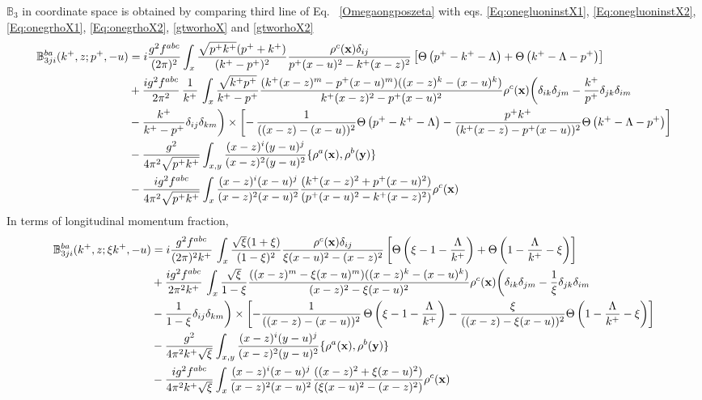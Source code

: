 \documentclass[aps,prd,amsmath,amssymb,nofootinbib]{revtex4-2}
\def\mf#1{\mathbb{#1}}
\def\v#1{\mathbf{#1}}
\numberwithin{equation}{section}
\begin{document}
$\mf{B}_{3}$ in coordinate space is obtained by comparing third line of Eq.~ \eqref{Omegaongposzeta} with eqs. \eqref{Eq:onegluoninstX1}, \eqref{Eq:onegluoninstX2}, \eqref{Eq:onegrhoX1}, \eqref{Eq:onegrhoX2}, \eqref{gtworhoX} and \eqref{gtworhoX2}
\begin{align}
   \mf{B}^{ba}_{3ji}(k^+, z;p^+, -u) & = i \frac{g^2 f^{abc}}{(2\pi)^{2}} \int_{x} %
   \frac{\sqrt{p^{+}k^{+}}(p^{+}+k^{+})} {(k^{+}-p^{+})^2} \frac{\rho^c(\v{x}) \delta_{ij}}{p^{+}(x-u)^{2} - k^{+}(x-z)^{2} }\left[\Theta\left(p^{+} - k^{+} - \Lambda \right)+\Theta\left(k^{+}-\Lambda-p^{+}\right)\right]  \notag \\ & + \frac{ig^2 f^{abc}} {2\pi^{2} } \,\frac{1}{k^{+}}\, 
   \int_{x}  
   \frac{\sqrt{k^{+}p^{+}}}{k^{+}-p^{+}} 
   \frac{(k^{+}(x-z)^{m} - p^{+} (x-u)^m)((x-z)^{k} -  (x-u)^{k})} {k^{+}(x-z)^{2} - p^{+} (x-u)^2}
   \rho^c(\v{x}) \bigg( 
  \delta_{ik} \delta_{jm}
  - \frac{k^{+}}{p^{+}}\delta_{jk} \delta_{im}
 \notag \\ &  - \frac{k^{+}}{k^{+}-p^{+}}\delta_{ij} \delta_{km}
   \bigg)\times\left[-\,\frac{1}{((x-z) -  (x-u))^2}\Theta\left(p^{+} - k^{+} - \Lambda \right)-\frac{p^{+}k^{+}}{(k^{+}(x-z) -  p^{+} (x-u))^2} \Theta\left(k^{+}-\Lambda-p^{+}\right)\right]\notag \\ & -\frac{g^{2}}{4\pi^{2} \sqrt{p^{+}k^{+}}}\int_{x,y}\frac{(x-z)^{i} (y-u)^{j}}{(x-z)^{ 2}(y-u)^{2}}\{\rho^{a}(\v{x}),\rho^{b}(\v{y})\} \notag \\ &  -\frac{ig^{2}f^{abc}}{4\pi^{2} \sqrt{p^{+}k^{+}}} \int_{x}\frac{(x-z)^{i}(x-u)^{j}}{(x-z)^{2}(x-u)^{2}}\frac{(k^{+}(x-z)^{2} +p^{+} (x-u)^{2})}{(p^{+} (x-u)^{2}-k^{+}(x-z)^{2})}\rho^{c}(\v{x})
\end{align}
In terms of longitudinal momentum fraction,
\begin{align}
   \mf{B}^{ba}_{3ji}(k^+, z;\xi k^+, -u) & = i \frac{g^2 f^{abc}}{(2\pi)^{2} k^{+}}\,\int_{x}
   \frac{\sqrt{\xi} (1+\xi) } {(1-\xi)^2} \frac{\rho^c(\v{x}) \delta_{ij}}{\xi (x-u)^{2} - (x-z)^{2} }\left[\Theta\left(\xi - 1 - \frac{\Lambda}{k^{+}}\right)+\Theta\left(1-\frac{\Lambda}{k^{+}}-\xi\right)\right]  \notag \\ & + \frac{ig^2 f^{abc}} {2\pi^{2} k^{+}}\,  
   \int_{x}  
   \frac{\sqrt{\xi}}{1-\xi} 
   \frac{((x-z)^{m} - \xi (x-u)^m)((x-z)^{k} -  (x-u)^{k})} {(x-z)^{2} - \xi (x-u)^2}
   \rho^c(\v{x}) \bigg( 
  \delta_{ik} \delta_{jm}
  - \frac{1}{\xi}\delta_{jk} \delta_{im}
 \notag \\ &  - \frac{1}{1-\xi}\delta_{ij} \delta_{km}
   \bigg)\times  \left[-\frac{1}{((x-z) -  (x-u))^2}\,\Theta\left(\xi - 1 - \frac{\Lambda}{k^{+}}\right)-\frac{\xi}{((x-z) -  \xi (x-u))^2} \Theta\left(1-\frac{\Lambda}{k^{+}}-\xi\right)\right]\notag \\ & -\frac{g^{2}}{4\pi^{2} k^{+}\sqrt{\xi}}\int_{x,y}\frac{(x-z)^{i} (y-u)^{j}}{(x-z)^{ 2}(y-u)^{2}}\{\rho^{a}(\v{x}),\rho^{b}(\v{y})\} \notag \\ &  -\frac{ig^{2}f^{abc}}{4\pi^{2} k^{+}\sqrt{\xi}} \int_{x}\frac{(x-z)^{i}(x-u)^{j}}{(x-z)^{2}(x-u)^{2}}\frac{((x-z)^{2} +\xi (x-u)^{2})}{(\xi (x-u)^{2}-(x-z)^{2})}\rho^{c}(\v{x})
\end{align}
\end{document}
